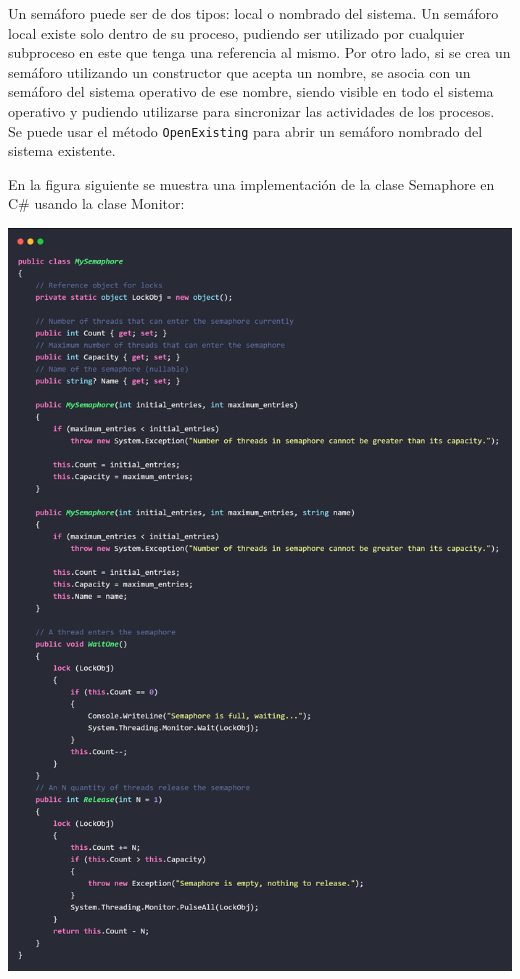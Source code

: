 \documentclass[10pt]{article} %
\newcommand{\csl}[1]{\colorbox{backcolour}{\texttt{#1}}}
\begin{document}
Un sem\'aforo puede ser de dos tipos: local o nombrado del sistema. Un semáforo local existe solo dentro de su proceso, pudiendo ser utilizado por cualquier subproceso en este que tenga una referencia al mismo. Por otro lado, si se crea un sem\'aforo utilizando un constructor que acepta un nombre, se asocia con un semáforo del sistema operativo de ese nombre, siendo visible en todo el sistema operativo y pudiendo utilizarse para sincronizar las actividades de los procesos. Se puede usar el método \csl{OpenExisting} para abrir un semáforo nombrado del sistema existente.

En la figura siguiente se muestra una implementación de la clase Semaphore en C\# usando la clase Monitor:

\begin{center}
	\includegraphics[width=15cm]{MySemaphore.jpg}
\end{center}
\end{document}
